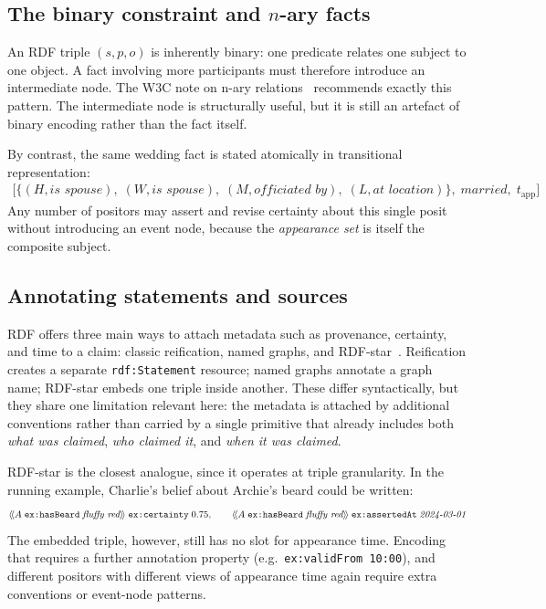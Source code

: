 \documentclass[a4paper,fleqn]{cas-sc}
\begin{document}
\subsection{The binary constraint and \(n\)-ary facts}
An RDF triple $(s, p, o)$ is inherently binary: one predicate relates one subject to one object. A fact involving more participants must therefore introduce an intermediate node. The W3C note on n-ary relations~\cite{NoyRector} recommends exactly this pattern. The intermediate node is structurally useful, but it is still an artefact of binary encoding rather than the fact itself.

By contrast, the same wedding fact is stated atomically in transitional representation:
\begin{align*}
\bigl[\{(H, \textit{is spouse}),\;(W, \textit{is spouse}),\;(M, \textit{officiated by}),\;(L, \textit{at location})\},\;\textit{married},\; t_{\mathrm{app}}\bigr]
\end{align*}
Any number of positors may assert and revise certainty about this single posit without introducing an event node, because the \emph{appearance set} is itself the composite subject.

\subsection{Annotating statements and sources}
RDF offers three main ways to attach metadata such as provenance, certainty, and time to a claim: classic reification, named graphs, and RDF-star~\cite{CarrollEtAl,HartigChampin,NoyRector}. Reification creates a separate \texttt{rdf:Statement} resource; named graphs annotate a graph name; RDF-star embeds one triple inside another. These differ syntactically, but they share one limitation relevant here: the metadata is attached by additional conventions rather than carried by a single primitive that already includes both \emph{what was claimed}, \emph{who claimed it}, and \emph{when it was claimed}.

RDF-star is the closest analogue, since it operates at triple granularity. In the running example, Charlie's belief about Archie's beard could be written:
\begin{align*}
\langle\!\langle A\;\texttt{ex:hasBeard}\;\textit{fluffy red}\rangle\!\rangle\;\texttt{ex:certainty}\;0.75, \qquad
\langle\!\langle A\;\texttt{ex:hasBeard}\;\textit{fluffy red}\rangle\!\rangle\;\texttt{ex:assertedAt}\;\textit{2024\text{-}03\text{-}01}
\end{align*}
The embedded triple, however, still has no slot for appearance time. Encoding that requires a further annotation property (e.g.\ \texttt{ex:validFrom~10:00}), and different positors with different views of appearance time again require extra conventions or event-node patterns.
\end{document}
